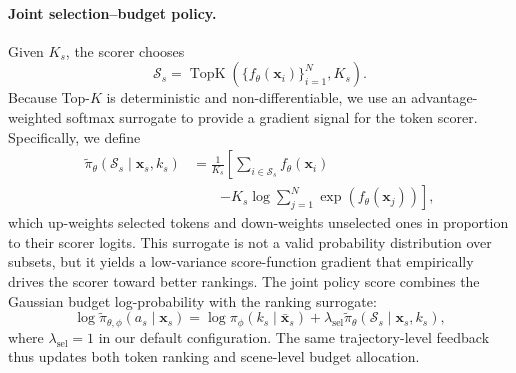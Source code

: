 \documentclass[letterpaper]{article} %
\begin{document}
\paragraph{Joint selection--budget policy.}
Given $K_s$, the scorer chooses
\begin{equation}
\mathcal{S}_s =
\operatorname{TopK}
\left(\{f_\theta(\mathbf{x}_i)\}_{i=1}^{N},K_s\right).
\end{equation}
Because Top-$K$ is deterministic and non-differentiable, we use an
advantage-weighted softmax surrogate to provide a gradient signal for the token
scorer. Specifically, we define
\begin{equation}
\begin{split}
\widetilde{\pi}_\theta(\mathcal{S}_s\mid\mathbf{x}_s,k_s)
&= \frac{1}{K_s}\left[
\sum_{i\in\mathcal{S}_s} f_\theta(\mathbf{x}_i)
\right. \\
&\qquad\left.
-K_s\log\sum_{j=1}^{N}
\exp\left(f_\theta(\mathbf{x}_j)\right)
\right],
\end{split}
\label{eq:selection-policy}
\end{equation}
which up-weights selected tokens and down-weights unselected ones in proportion
to their scorer logits. This surrogate is not a valid probability distribution
over subsets, but it yields a low-variance score-function gradient that
empirically drives the scorer toward better rankings. The joint policy score
combines the Gaussian budget log-probability with the ranking surrogate:
\begin{equation}
\log\widetilde{\pi}_{\theta,\phi}(a_s\mid\mathbf{x}_s)
=
\log\pi_\phi(k_s\mid\bar{\mathbf{x}}_s)
+\lambda_{\mathrm{sel}}
\widetilde{\pi}_\theta
(\mathcal{S}_s\mid\mathbf{x}_s,k_s),
\label{eq:joint-policy}
\end{equation}
where $\lambda_{\mathrm{sel}}{=}1$ in our default configuration. The same
trajectory-level feedback thus updates both token ranking and scene-level budget
allocation.
\end{document}
